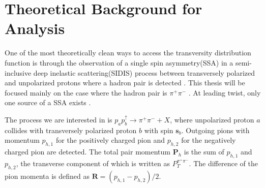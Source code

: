 \documentclass[abstract = on,listof=totoc, bibliography=totoc]{scrreprt}
\newcommand{\ptpair}{P_{T}^{\pi^+\pi^-}}
\newcommand{\pip}{\pi^+}
\newcommand{\pim}{\pi^-}
\newcommand{\pair}{$\pip\pim$ }
\begin{document}

\chapter{Theoretical Background for Analysis}
\label{ch:theory}

One of the most theoretically clean ways to access the transversity distribution function is through the observation of a single spin asymmetry(SSA) in a semi-inclusive deep inelastic scattering(SIDIS) process between transversely polarized and unpolarized protons where a hadron pair is detected \cite{bacchettaRadici2}. This thesis will be focused mainly on the case where the hadron pair is \pair. At leading twist, only one source of a SSA exists \cite{bacchettaRadici2}. 

The process we are interested in is $p_ap_b^\uparrow \rightarrow \pi^+\pi^- + X$, where unpolarized proton $a$ collides with transversely polarized proton $b$ with spin $\boldsymbol{s}_b$. Outgoing pions with momentum $p_{h,1}$ for the positively charged pion and $p_{h,2}$ for the negatively charged pion are detected. The total pair momentum $\bm{P}_h$ is the sum of $p_{h,1}$ and $p_{h,2}$, the transverse component of which is written as $\ptpair$. 
 The difference of the pion momenta is defined as $\bm{R}= (p_{h,1}-p_{h,2})/2$.
\end{document}
